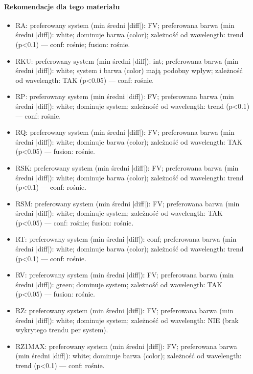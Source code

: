 \documentclass[
  10pt,
]{article}
\begin{document}
\paragraph{Rekomendacje dla tego materiału}
\begin{itemize}
\item RA: preferowany system (min średni |diff|): FV; preferowana barwa (min średni |diff|): white; dominuje barwa (color); zależność od wavelength: trend (p<0.1) — conf: rośnie; fusion: rośnie.
\item RKU: preferowany system (min średni |diff|): int; preferowana barwa (min średni |diff|): white; system i barwa (color) mają podobny wpływ; zależność od wavelength: TAK (p<0.05) — conf: rośnie.
\item RP: preferowany system (min średni |diff|): FV; preferowana barwa (min średni |diff|): white; dominuje system; zależność od wavelength: trend (p<0.1) — conf: rośnie.
\item RQ: preferowany system (min średni |diff|): FV; preferowana barwa (min średni |diff|): white; dominuje barwa (color); zależność od wavelength: TAK (p<0.05) — fusion: rośnie.
\item RSK: preferowany system (min średni |diff|): FV; preferowana barwa (min średni |diff|): white; dominuje barwa (color); zależność od wavelength: trend (p<0.1) — conf: rośnie.
\item RSM: preferowany system (min średni |diff|): FV; preferowana barwa (min średni |diff|): white; dominuje system; zależność od wavelength: TAK (p<0.05) — conf: rośnie; fusion: rośnie.
\item RT: preferowany system (min średni |diff|): conf; preferowana barwa (min średni |diff|): white; dominuje barwa (color); zależność od wavelength: trend (p<0.1) — conf: rośnie.
\item RV: preferowany system (min średni |diff|): FV; preferowana barwa (min średni |diff|): green; dominuje system; zależność od wavelength: TAK (p<0.05) — fusion: rośnie.
\item RZ: preferowany system (min średni |diff|): FV; preferowana barwa (min średni |diff|): white; dominuje system; zależność od wavelength: NIE (brak wykrytego trendu per system).
\item RZ1MAX: preferowany system (min średni |diff|): FV; preferowana barwa (min średni |diff|): white; dominuje barwa (color); zależność od wavelength: trend (p<0.1) — conf: rośnie.
\end{itemize}
\end{document}
